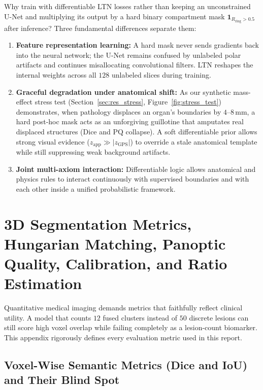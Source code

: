 \documentclass[10pt,a4paper]{article}
\renewcommand{\_}{\origunderscore\allowbreak}
\begin{document}
Why train with differentiable LTN losses rather than keeping an unconstrained U-Net and multiplying its output by a hard binary compartment mask $\mathbf{1}_{R_{\text{ring}} > 0.5}$ after inference? Three fundamental differences separate them:
\begin{enumerate}
    \item \textbf{Feature representation learning:} A hard mask never sends gradients back into the neural network; the U-Net remains confused by unlabeled polar artifacts and continues misallocating convolutional filters. LTN reshapes the internal weights across all $128$ unlabeled slices during training.
    \item \textbf{Graceful degradation under anatomical shift:} As our synthetic mass-effect stress test (Section~\ref{sec:res_stress}, Figure~\ref{fig:stress_test}) demonstrates, when pathology displaces an organ's boundaries by $4\text{--}8\,\text{mm}$, a hard post-hoc mask acts as an unforgiving guillotine that amputates real displaced structures ($\text{Dice}$ and $\text{PQ}$ collapse). A soft differentiable prior allows strong visual evidence ($z_{\text{app}} \gg |z_{\text{GPS}}|$) to override a stale anatomical template while still suppressing weak background artifacts.
    \item \textbf{Joint multi-axiom interaction:} Differentiable logic allows anatomical and physics rules to interact continuously with supervised boundaries and with each other inside a unified probabilistic framework.
\end{enumerate}

\clearpage
\section[3D Metrics, PQ, Calibration \& Ratio Estimation]{3D Segmentation Metrics, Hungarian Matching, Panoptic Quality, Calibration, and Ratio Estimation}
\label{app:metrics}

Quantitative medical imaging demands metrics that faithfully reflect clinical utility. A model that counts $12$ fused clusters instead of $50$ discrete lesions can still score high voxel overlap while failing completely as a lesion-count biomarker. This appendix rigorously defines every evaluation metric used in this report.

\subsection{Voxel-Wise Semantic Metrics (Dice and IoU) and Their Blind Spot}
\end{document}

